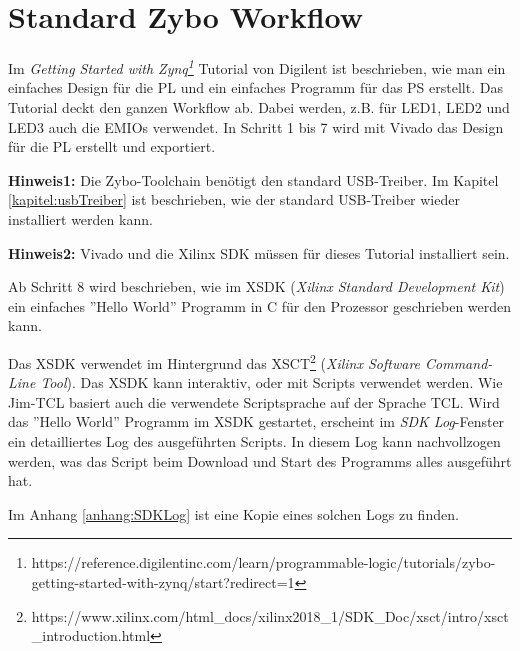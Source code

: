 
\section{Standard Zybo Workflow}
Im \textit{Getting Started with Zynq\footnote{https://reference.digilentinc.com/learn/programmable-logic/tutorials/zybo-getting-started-with-zynq/start?redirect=1}} Tutorial von Digilent ist beschrieben, wie man ein einfaches Design für die PL und ein einfaches Programm für das PS erstellt.
Das Tutorial deckt den ganzen Workflow ab.
Dabei werden, z.B. für LED1, LED2 und LED3 auch die EMIOs verwendet.
In Schritt 1 bis 7 wird mit Vivado das Design für die PL erstellt und exportiert.

\textbf{Hinweis1:} Die Zybo-Toolchain benötigt den standard USB-Treiber. Im Kapitel \ref{kapitel:usbTreiber} ist beschrieben, wie der standard USB-Treiber wieder installiert werden kann.

\textbf{Hinweis2:} Vivado und die Xilinx SDK müssen für dieses Tutorial installiert sein.

Ab Schritt 8 wird beschrieben, wie im XSDK (\textit{Xilinx Standard Development Kit}) ein einfaches ''Hello World'' Programm in C für den Prozessor geschrieben werden kann.

Das XSDK verwendet im Hintergrund das XSCT\footnote{https://www.xilinx.com/html\_docs/xilinx2018\_1/SDK\_Doc/xsct/intro/xsct\_introduction.html} (\textit{Xilinx Software Command-Line Tool}).
Das XSDK kann interaktiv, oder mit Scripts verwendet werden.
Wie Jim-TCL basiert auch die verwendete Scriptsprache auf der Sprache TCL.
Wird das ''Hello World'' Programm im XSDK gestartet, erscheint im \textit{SDK Log}-Fenster ein detailliertes Log des ausgeführten Scripts.
In diesem Log kann nachvollzogen werden, was das Script beim Download und Start des Programms alles ausgeführt hat.

Im Anhang \ref{anhang:SDKLog} ist eine Kopie eines solchen Logs zu finden.

